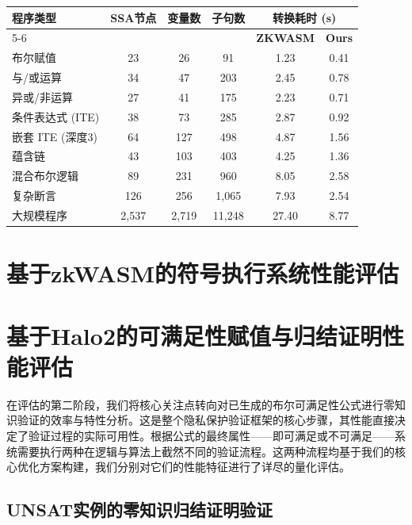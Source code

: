 \begin{table}[htbp]
\centering
{}
\label{tab:phase1-perf}
\begin{tabular}{lccccc}
\toprule
\multirow{2}{*}{\textbf{程序类型}} & \multirow{2}{*}{\textbf{SSA节点}} & \multirow{2}{*}{\textbf{变量数}} & \multirow{2}{*}{\textbf{子句数}} & \multicolumn{2}{c}{\textbf{转换耗时 (s)}} \\
\cline{5-6}
& & & & \textbf{ZKWASM} & \textbf{Ours} \\
\midrule
布尔赋值 & 23 & 26 & 91 & 1.23 & 0.41 \\
与/或运算 & 34 & 47 & 203 & 2.45 & 0.78 \\
异或/非运算 & 27 & 41 & 175 & 2.23 & 0.71 \\
条件表达式 (ITE) & 38 & 73 & 285 & 2.87 & 0.92 \\
嵌套 ITE (深度3) & 64 & 127 & 498 & 4.87 & 1.56 \\
蕴含链 & 43 & 103 & 403 & 4.25 & 1.36 \\
混合布尔逻辑 & 89 & 231 & 960 & 8.05 & 2.58 \\
复杂断言 & 126 & 256 & 1,065 & 7.93 & 2.54 \\
大规模程序 & 2,537 & 2,719 & 11,248 & 27.40 & 8.77 \\
\bottomrule
\end{tabular}
\end{table}

\section{基于zkWASM的符号执行系统性能评估}

\section{基于Halo2的可满足性赋值与归结证明性能评估}

在评估的第二阶段，我们将核心关注点转向对已生成的布尔可满足性公式进行零知识验证的效率与特性分析。这是整个隐私保护验证框架的核心步骤，其性能直接决定了验证过程的实际可用性。根据公式的最终属性——即可满足或不可满足——系统需要执行两种在逻辑与算法上截然不同的验证流程。这两种流程均基于我们的核心优化方案构建，我们分别对它们的性能特征进行了详尽的量化评估。

\subsection{UNSAT实例的零知识归结证明验证}

